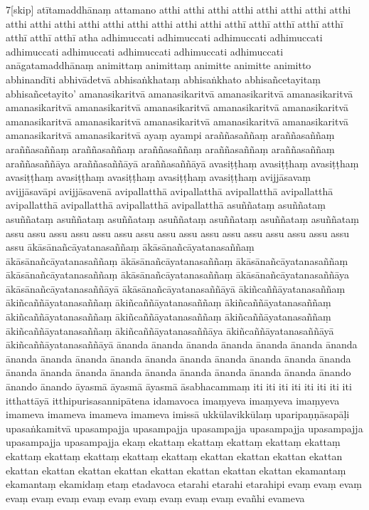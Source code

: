 \documentclass[12pt]{article}
\begin{document}
\begin{multicols}{7}[skip]
atītamaddhānaṃ
attamano
atthi
atthi
atthi
atthi
atthi
atthi
atthi
atthi
atthi
atthi
atthi
atthi
atthi
atthi
atthi
atthi
atthi
atthī
atthī
atthī
atthī
atthī
atthī
atthī
atthī
atha
adhimuccati
adhimuccati
adhimuccati
adhimuccati
adhimuccati
adhimuccati
adhimuccati
adhimuccati
adhimuccati
anāgatamaddhānaṃ
animittaṃ
animittaṃ
animitte
animitte
animitto
abhinandīti
abhivādetvā
abhisaṅkhataṃ
abhisaṅkhato
abhisañcetayitaṃ
abhisañcetayito’
amanasikaritvā
amanasikaritvā
amanasikaritvā
amanasikaritvā
amanasikaritvā
amanasikaritvā
amanasikaritvā
amanasikaritvā
amanasikaritvā
amanasikaritvā
amanasikaritvā
amanasikaritvā
amanasikaritvā
amanasikaritvā
amanasikaritvā
amanasikaritvā
ayaṃ
ayampi
araññasaññaṃ
araññasaññaṃ
araññasaññaṃ
araññasaññaṃ
araññasaññaṃ
araññasaññaṃ
araññasaññaṃ
araññasaññāya
araññasaññāyā
araññasaññāyā
avasiṭṭhaṃ
avasiṭṭhaṃ
avasiṭṭhaṃ
avasiṭṭhaṃ
avasiṭṭhaṃ
avasiṭṭhaṃ
avasiṭṭhaṃ
avasiṭṭhaṃ
avijjāsavaṃ
avijjāsavāpi
avijjāsavenā
avipallatthā
avipallatthā
avipallatthā
avipallatthā
avipallatthā
avipallatthā
avipallatthā
avipallatthā
asuññataṃ
asuññataṃ
asuññataṃ
asuññataṃ
asuññataṃ
asuññataṃ
asuññataṃ
asuññataṃ
asuññataṃ
assu
assu
assu
assu
assu
assu
assu
assu
assu
assu
assu
assu
assu
assu
assu
assu
assu
ākāsānañcāyatanasaññaṃ
ākāsānañcāyatanasaññaṃ
ākāsānañcāyatanasaññaṃ
ākāsānañcāyatanasaññaṃ
ākāsānañcāyatanasaññaṃ
ākāsānañcāyatanasaññaṃ
ākāsānañcāyatanasaññaṃ
ākāsānañcāyatanasaññāya
ākāsānañcāyatanasaññāyā
ākāsānañcāyatanasaññāyā
ākiñcaññāyatanasaññaṃ
ākiñcaññāyatanasaññaṃ
ākiñcaññāyatanasaññaṃ
ākiñcaññāyatanasaññaṃ
ākiñcaññāyatanasaññaṃ
ākiñcaññāyatanasaññaṃ
ākiñcaññāyatanasaññaṃ
ākiñcaññāyatanasaññaṃ
ākiñcaññāyatanasaññāya
ākiñcaññāyatanasaññāyā
ākiñcaññāyatanasaññāyā
ānanda
ānanda
ānanda
ānanda
ānanda
ānanda
ānanda
ānanda
ānanda
ānanda
ānanda
ānanda
ānanda
ānanda
ānanda
ānanda
ānanda
ānanda
ānanda
ānanda
ānanda
ānanda
ānanda
ānanda
ānanda
ānanda
ānando
ānando
ānando
āyasmā
āyasmā
āyasmā
āsabhacammaṃ
iti
iti
iti
iti
iti
iti
iti
iti
itthattāyā
itthipurisasannipātena
idamavoca
imaṃyeva
imaṃyeva
imaṃyeva
imameva
imameva
imameva
imameva
imissā
ukkūlavikkūlaṃ
uparipaṇṇāsapāḷi
upasaṅkamitvā
upasampajja
upasampajja
upasampajja
upasampajja
upasampajja
upasampajja
upasampajja
ekaṃ
ekattaṃ
ekattaṃ
ekattaṃ
ekattaṃ
ekattaṃ
ekattaṃ
ekattaṃ
ekattaṃ
ekattaṃ
ekattaṃ
ekattan
ekattan
ekattan
ekattan
ekattan
ekattan
ekattan
ekattan
ekattan
ekattan
ekattan
ekattan
ekamantaṃ
ekamantaṃ
ekamidaṃ
etaṃ
etadavoca
etarahi
etarahi
etarahipi
evaṃ
evaṃ
evaṃ
evaṃ
evaṃ
evaṃ
evaṃ
evaṃ
evaṃ
evaṃ
evaṃ
evaṃ
evañhi
evameva

\end{multicols}
\end{document}
